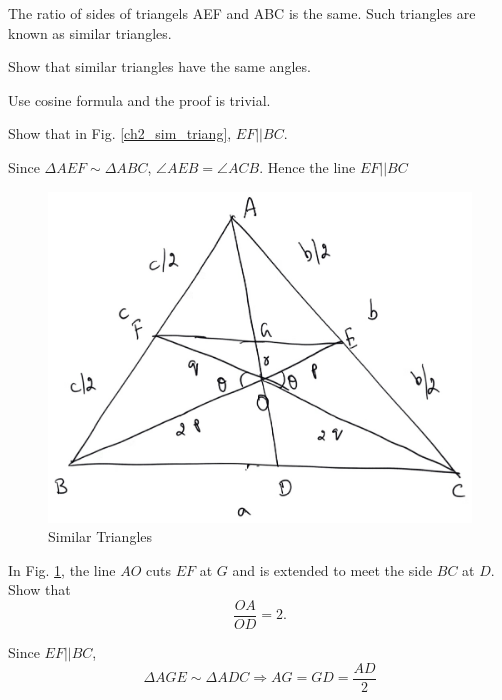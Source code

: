 %
\begin{definition}
	The ratio of sides of triangels AEF and ABC is the same.  Such triangles are known as similar triangles.
\end{definition}
\begin{problem}
	Show that similar triangles have the same angles.
\end{problem}
\proof Use cosine formula and the proof is trivial.
\begin{problem}
	Show that in Fig. \ref{ch2_sim_triang}, $EF || BC$.
\end{problem}
\proof Since $\Delta AEF \sim \Delta ABC$, $\angle AEB = \angle ACB$.  Hence the line $EF||BC$
%
\begin{figure}[!h]
	\begin{center}
		
		\includegraphics[width=\columnwidth]{./figs/ch2_median_3}
		\vspace*{-10cm}
	\end{center}
	\caption{Similar Triangles}
	\label{ch2_median_3}	
\end{figure}
%
\begin{problem}
	In Fig. \ref{ch2_median_3}, the line $AO$ cuts $EF$ at $G$ and is extended to meet the side $BC$ at $D$.  Show that 
	\begin{equation}
	\frac{OA}{OD} = 2.
	\end{equation}
\end{problem}
\proof Since $EF || BC$,
%
\begin{equation}
\Delta AGE \sim \Delta ADC \Rightarrow AG = GD = \frac{AD}{2}
\end{equation}
